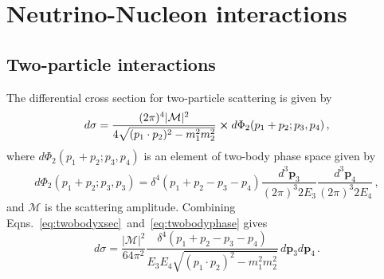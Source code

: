 \section{Neutrino-Nucleon interactions} \label{sec:theory}
\hspace{\parindent}

\subsection{Two-particle interactions}
  The differential cross section for two-particle scattering is given by
  \begin{equation}\label{eq:twobodyxsec}
    d\sigma = \frac{(2\pi)^4 |\mathcal{M}|^2}{4 \sqrt{(p_1\cdot p_2)^2 - m_1^2m_2^2}}
      \cross d\Phi_2(p_1+p_2;p_3,p_4) \,,
  \end{equation}
  where $d\Phi_2(p_1+p_2;p_3,p_4)$ is an element of two-body phase space given by
  \begin{equation}\label{eq:twobodyphase}
      d\Phi_2(p_1+p_2;p_3,p_3) = \delta^4(p_1+p_2 - p_3-p_4)
        \frac{d^3\mathbf{p}_3}{(2\pi)^3 2E_3}\frac{d^3\mathbf{p}_4}{(2\pi)^3 2E_4} \,,
  \end{equation}
  and $\mathcal{M}$ is the scattering amplitude.
  Combining Eqns.~\ref{eq:twobodyxsec}~and~\ref{eq:twobodyphase} gives
  \begin{equation}\label{eq:genxsec}
      d\sigma = \frac{|\mathcal{M}|^2}{64\pi^2}
        \frac{\delta^4(p_1+p_2-p_3-p_4)}{E_3E_4\sqrt{(p_1\cdot p_2)^2 - m_1^2m_2^2}}
        \, d\mathbf{p}_3d\mathbf{p}_4 \,.
  \end{equation}


